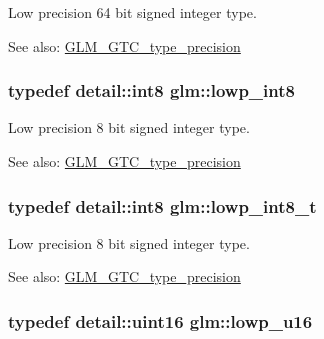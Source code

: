 Low precision 64 bit signed integer type. \begin{Desc}
\item[See also:]\hyperlink{group__gtc__type__precision}{GLM\_\-GTC\_\-type\_\-precision} \end{Desc}
\hypertarget{group__gtc__type__precision_gf9e675b6392764242ae87eb179e9d3d6}{
\subsubsection[lowp\_\-int8]{\setlength{\rightskip}{0pt plus 5cm}typedef detail::int8 {\bf glm::lowp\_\-int8}}}
\label{group__gtc__type__precision_gf9e675b6392764242ae87eb179e9d3d6}


Low precision 8 bit signed integer type. \begin{Desc}
\item[See also:]\hyperlink{group__gtc__type__precision}{GLM\_\-GTC\_\-type\_\-precision} \end{Desc}
\hypertarget{group__gtc__type__precision_ge6092311f6970a305c2df19a372360a3}{
\subsubsection[lowp\_\-int8\_\-t]{\setlength{\rightskip}{0pt plus 5cm}typedef detail::int8 {\bf glm::lowp\_\-int8\_\-t}}}
\label{group__gtc__type__precision_ge6092311f6970a305c2df19a372360a3}


Low precision 8 bit signed integer type. \begin{Desc}
\item[See also:]\hyperlink{group__gtc__type__precision}{GLM\_\-GTC\_\-type\_\-precision} \end{Desc}
\hypertarget{group__gtc__type__precision_g22c5364f27caa0a6eb0627cbc21e46be}{
\subsubsection[lowp\_\-u16]{\setlength{\rightskip}{0pt plus 5cm}typedef detail::uint16 {\bf glm::lowp\_\-u16}}}
\label{group__gtc__type__precision_g22c5364f27caa0a6eb0627cbc21e46be}


